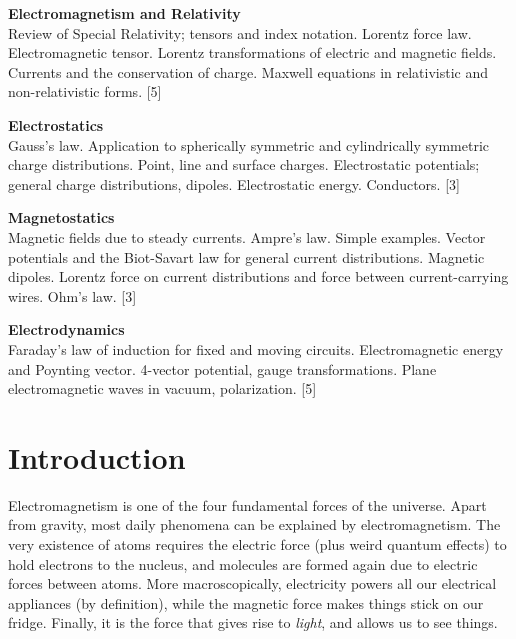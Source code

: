 \documentclass[a4paper]{article}
\begin{document}
\maketitle
{\small
\noindent\textbf{Electromagnetism and Relativity}\\
Review of Special Relativity; tensors and index notation. Lorentz force law. Electromagnetic tensor. Lorentz transformations of electric and magnetic fields. Currents and the conservation of charge. Maxwell equations in relativistic and non-relativistic forms.\hspace*{\fill} [5]

\vspace{10pt}
\noindent\textbf{Electrostatics}\\
Gauss's law. Application to spherically symmetric and cylindrically symmetric charge distributions. Point, line and surface charges. Electrostatic potentials; general charge distributions, dipoles. Electrostatic energy. Conductors.\hspace*{\fill} [3]

\vspace{10pt}
\noindent\textbf{Magnetostatics}\\
Magnetic fields due to steady currents. Ampre's law. Simple examples. Vector potentials and the Biot-Savart law for general current distributions. Magnetic dipoles. Lorentz force on current distributions and force between current-carrying wires. Ohm's law.\hspace*{\fill} [3]

\vspace{10pt}
\noindent\textbf{Electrodynamics}\\
Faraday's law of induction for fixed and moving circuits. Electromagnetic energy and Poynting vector. 4-vector potential, gauge transformations. Plane electromagnetic waves in vacuum, polarization.\hspace*{\fill} [5]}

\tableofcontents

\setcounter{section}{-1}
\section{Introduction}
Electromagnetism is one of the four fundamental forces of the universe. Apart from gravity, most daily phenomena can be explained by electromagnetism. The very existence of atoms requires the electric force (plus weird quantum effects) to hold electrons to the nucleus, and molecules are formed again due to electric forces between atoms. More macroscopically, electricity powers all our electrical appliances (by definition), while the magnetic force makes things stick on our fridge. Finally, it is the force that gives rise to \emph{light}, and allows us to see things.
\end{document}
